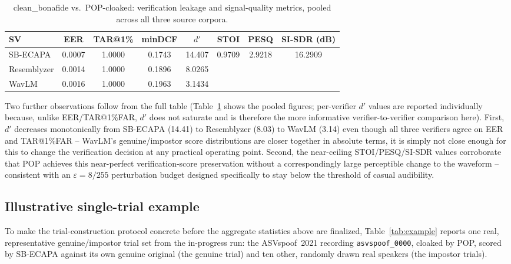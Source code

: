 \documentclass[11pt]{article}
\begin{document}
\begin{table}[H]
\centering
\caption{clean\_bonafide vs.\ POP-cloaked: verification leakage and
signal-quality metrics, pooled across all three source corpora.}
\label{tab:results}
\begin{tabular}{lccccccc}
\toprule
SV & EER & TAR@1\% & minDCF & $d'$ & STOI & PESQ & SI-SDR (dB) \\
\midrule
SB-ECAPA     & 0.0007 & 1.0000 & 0.1743 & 14.407 & \multirow{3}{*}{0.9709} & \multirow{3}{*}{2.9218} & \multirow{3}{*}{16.2909} \\
Resemblyzer  & 0.0014 & 1.0000 & 0.1896 & 8.0265 & & & \\
WavLM        & 0.0016 & 1.0000 & 0.1963 & 3.1434 & & & \\
\bottomrule
\end{tabular}
\end{table}

Two further observations follow from the full table
(Table~\ref{tab:results} shows the pooled figures; per-verifier $d'$
values are reported individually because, unlike EER/TAR@1\%FAR, $d'$
does not saturate and is therefore the more informative
verifier-to-verifier comparison here). First, $d'$ decreases
monotonically from SB-ECAPA (14.41) to Resemblyzer (8.03) to WavLM
(3.14) even though all three verifiers agree on EER and TAR@1\%FAR --
WavLM's genuine/impostor score distributions are closer together in
absolute terms, it is simply not close enough for this to change the
verification decision at any practical operating point. Second, the
near-ceiling STOI/PESQ/SI-SDR values corroborate that POP achieves
this near-perfect verification-score preservation without a
correspondingly large perceptible change to the waveform -- consistent
with an $\varepsilon=8/255$ perturbation budget designed specifically
to stay below the threshold of casual audibility.

\subsection{Illustrative single-trial example}
To make the trial-construction protocol concrete before the aggregate
statistics above are finalized, Table~\ref{tab:example} reports one
real, representative genuine/impostor trial set from the in-progress
run: the ASVspoof~2021 recording \texttt{asvspoof\_0000}, cloaked by
POP, scored by SB-ECAPA against its own genuine original (the genuine
trial) and ten other, randomly drawn real speakers (the impostor
trials).
\end{document}
